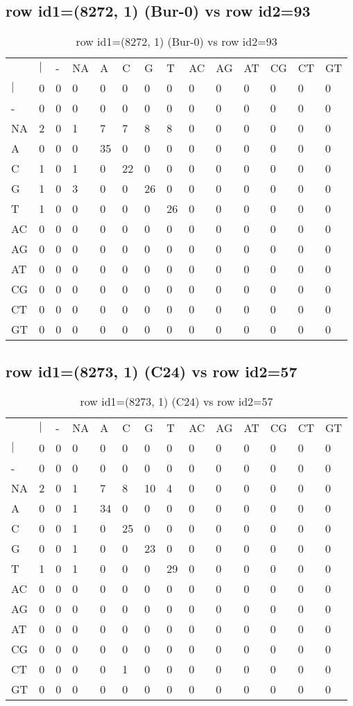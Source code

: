 \subsection{row id1=(8272, 1) (Bur-0) vs row id2=93}
\begin{center}
\begin{longtable}{|l|l|l|l|l|l|l|l|l|l|l|l|l|l|}
\caption{row id1=(8272, 1) (Bur-0) vs row id2=93} \label{table_dm232}\\
\hline
\\
\hline
&$|$&-&NA&A&C&G&T&AC&AG&AT&CG&CT&GT\\
$|$&0&0&0&0&0&0&0&0&0&0&0&0&0\\
-&0&0&0&0&0&0&0&0&0&0&0&0&0\\
NA&2&0&1&7&7&8&8&0&0&0&0&0&0\\
A&0&0&0&35&0&0&0&0&0&0&0&0&0\\
C&1&0&1&0&22&0&0&0&0&0&0&0&0\\
G&1&0&3&0&0&26&0&0&0&0&0&0&0\\
T&1&0&0&0&0&0&26&0&0&0&0&0&0\\
AC&0&0&0&0&0&0&0&0&0&0&0&0&0\\
AG&0&0&0&0&0&0&0&0&0&0&0&0&0\\
AT&0&0&0&0&0&0&0&0&0&0&0&0&0\\
CG&0&0&0&0&0&0&0&0&0&0&0&0&0\\
CT&0&0&0&0&0&0&0&0&0&0&0&0&0\\
GT&0&0&0&0&0&0&0&0&0&0&0&0&0\\
\hline
\end{longtable}
\end{center}

\subsection{row id1=(8273, 1) (C24) vs row id2=57}
\begin{center}
\begin{longtable}{|l|l|l|l|l|l|l|l|l|l|l|l|l|l|}
\caption{row id1=(8273, 1) (C24) vs row id2=57} \label{table_dm234}\\
\hline
\\
\hline
&$|$&-&NA&A&C&G&T&AC&AG&AT&CG&CT&GT\\
$|$&0&0&0&0&0&0&0&0&0&0&0&0&0\\
-&0&0&0&0&0&0&0&0&0&0&0&0&0\\
NA&2&0&1&7&8&10&4&0&0&0&0&0&0\\
A&0&0&1&34&0&0&0&0&0&0&0&0&0\\
C&0&0&1&0&25&0&0&0&0&0&0&0&0\\
G&0&0&1&0&0&23&0&0&0&0&0&0&0\\
T&1&0&1&0&0&0&29&0&0&0&0&0&0\\
AC&0&0&0&0&0&0&0&0&0&0&0&0&0\\
AG&0&0&0&0&0&0&0&0&0&0&0&0&0\\
AT&0&0&0&0&0&0&0&0&0&0&0&0&0\\
CG&0&0&0&0&0&0&0&0&0&0&0&0&0\\
CT&0&0&0&0&1&0&0&0&0&0&0&0&0\\
GT&0&0&0&0&0&0&0&0&0&0&0&0&0\\
\hline
\end{longtable}
\end{center}


